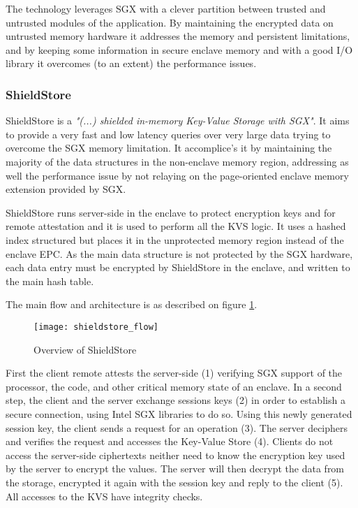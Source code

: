 The technology leverages \gls{SGX} with a clever partition between trusted and untrusted modules of the application. By maintaining the encrypted data on untrusted memory hardware it addresses the memory and persistent limitations, and by keeping some information in secure enclave memory and with a good \gls{I/O} library it overcomes (to an extent) the performance issues.

\subsubsection{ShieldStore}
\label{sssec:shieldstore}

ShieldStore \cite{shieldstore:1} is a \textit{"(...) shielded in-memory Key-Value Storage with \gls{SGX}"}. It aims to provide a very fast and low latency queries over very large data trying to overcome the \gls{SGX} memory limitation. It accomplice's it by maintaining the majority of the data structures in the non-enclave memory region, addressing as well the performance issue by not relaying on the page-oriented enclave memory extension provided by \gls{SGX}.

ShieldStore runs server-side in the enclave to protect encryption keys and for remote attestation and it is used to perform all the \gls{KVS} logic. It uses a hashed index structured but places it in the unprotected memory region instead of the enclave \gls{EPC}. As the main data structure is not protected by the \gls{SGX} hardware, each data entry must be encrypted by ShieldStore in the enclave, and written to the main hash table.

The main flow and architecture is as described on figure \ref{fig:shieldstore_overview}.

\begin{figure}[htbp]
	\centering
	{\texttt{[image: shieldstore\_flow]}}%
	\caption{Overview of ShieldStore}
	\label{fig:shieldstore_overview}
\end{figure}

First the client remote attests the server-side (1) verifying \gls{SGX} support of the processor, the code, and other critical memory state of an enclave. In a second step, the client and the server exchange sessions keys (2) in order to establish a secure connection, using Intel \gls{SGX} libraries to do so. Using this newly generated session key, the client sends a request for an operation (3). The server deciphers and verifies the request and accesses the Key-Value Store (4). Clients do not access the server-side ciphertexts neither need to know the encryption key used by the server to encrypt the values. The server will then decrypt the data from the storage, encrypted it again with the session key and reply to the client (5). All accesses to the \gls{KVS} have integrity checks.

